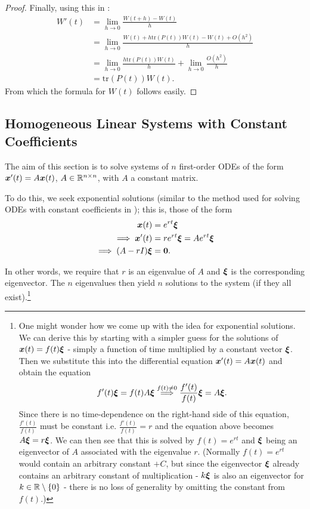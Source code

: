 \begin{proof}
	Finally, using this in :
	\begin{align*}
		W'(t) &= \lim_{h\to 0} \frac{W(t+h) - W(t)}{h} \\
		&= \lim_{h\to 0} \frac{W(t) + h \text{tr}(P(t)) W(t) - W(t) + O(h^2)}{h} \\
		&= \lim_{h\to 0} \frac{h\text{tr}(P(t)) W(t)}{h} + \lim_{h\to 0}\frac{O(h^2)}{h} \\
		&= \text{tr}(P(t)) W(t).
	\end{align*}
	From which the formula for $W(t)$ follows easily.
\end{proof}

\subsection{Homogeneous Linear Systems with Constant Coefficients}\label{sec:homocc}

The aim of this section is to solve systems of $n$ first-order ODEs of the form $\bm{x}'(t) = A \bm{x}(t)$, $A \in \mathbb{R}^{n\times n}$, with $A$ a constant matrix.

To do this, we seek exponential solutions (similar to the method used for solving ODEs with constant coefficients in ); this is, those of the form
\begin{align*}
	\bm{x}(t) &= e^{rt} \bm{\xi} \\
	\implies \bm{x}'(t) &= re^{rt} \bm{\xi} = A e^{rt} \bm{\xi} \\
	\implies (A-rI)\bm{\xi} &= \bm{0}.
\end{align*}

In other words, we require that $r$ is an eigenvalue of $A$ and $\bm{\xi}$ is the corresponding eigenvector. The $n$ eigenvalues then yield $n$ solutions to the system (if they all exist).\footnote{One might wonder how we come up with the idea for exponential solutions. We can derive this by starting with a simpler guess for the solutions of $\bm{x}(t) = f(t)\bm{\xi}$ - simply a function of time multiplied by a constant vector $\bm{\xi}$. Then we substitute this into the differential equation $\bm{x}'(t) = A \bm{x}(t)$ and obtain the equation
\[
	f'(t) \bm{\xi} = f(t) A \bm{\xi} \overset{f(t) \neq 0}{\implies} \frac{f'(t)}{f(t)}\bm{\xi} = A\bm{\xi}.
\]
Since there is no time-dependence on the right-hand side of this equation, $\frac{f'(t)}{f(t)}$ must be constant i.e. $\frac{f'(t)}{f(t)} = r$ and the equation above becomes $A\bm{\xi} = r \bm{\xi}$. We can then see that this is solved by $f(t) = e^{rt}$ and $\bm{\xi}$ being an eigenvector of $A$ associated with the eigenvalue $r$. (Normally $f(t) = e^{rt}$ would contain an arbitrary constant $+C$, but since the eigenvector $\bm{\xi}$ already contains an arbitrary constant of multiplication - $k\bm{\xi}$ is also an eigenvector for $k \in \mathbb{R} \setminus \{0\}$ - 	there is no loss of generality by omitting the constant from $f(t)$.)}

